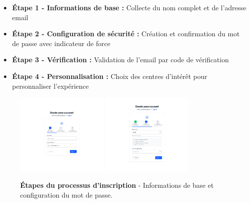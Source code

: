 \begin{itemize}
  \item \textbf{Étape 1 - Informations de base :} Collecte du nom complet et de l'adresse email
  \item \textbf{Étape 2 - Configuration de sécurité :} Création et confirmation du mot de passe avec indicateur de force
  \item \textbf{Étape 3 - Vérification :} Validation de l'email par code de vérification
  \item \textbf{Étape 4 - Personnalisation :} Choix des centres d'intérêt pour personnaliser l'expérience
\end{itemize}

\begin{figure}[H]
  \centering
  \includegraphics[width=0.4\textwidth,keepaspectratio]{old-reports/week_4_img/etap1.jpeg}
  \includegraphics[width=0.4\textwidth,keepaspectratio]{old-reports/week_4_img/etap2.jpeg}
  \caption{\textbf{Étapes du processus d'inscription} - Informations de base et configuration du mot de passe.}
  \label{fig:signup_steps}
\end{figure}

